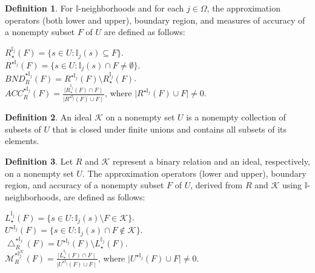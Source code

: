 \documentclass{article}
\theoremstyle{theorem}
\theoremstyle{definition}
\newtheorem{definition}{Definition}[section]
\theoremstyle{remark}
\begin{document}
\begin{definition} \label{d6} \cite{Al-shami 2021} For $\mathbb{I}$-neighborhoods and for each $j \in \Omega$, the approximation operators (both lower and upper), boundary region, and measures of accuracy of a nonempty subset $F$ of $U$ are defined as follows:

\begin{center}
$R_{\star}^{\mathbb{I}_j}(F) = \{s \in U : \mathbb{I}_{j}(s) \subseteq F\}$.\\
$R^{\star\mathbb{I}_j}(F) = \{s \in U : \mathbb{I}_{j}(s) \cap F \neq\emptyset\}$.\\
$BND_{R}^{\star\mathbb{I}_j}(F) = R^{\star\mathbb{I}_j}(F) \setminus R_{\star}^{\mathbb{I}_j}(F)$.\\
$ACC_{R}^{\star\mathbb{I}_j}(F) = \frac{\mid R_{\star}^{\mathbb{I}_j}(F)\cap F\mid}{\mid R^{\star\mathbb{I}_j}(F)\cup F\mid}$, where $\mid R^{\star\mathbb{I}_j}(F)\cup F\mid\neq0$.
\color{black}
\end{center}
\end{definition}

\begin{definition} \label{d7} \cite{Kuratowski 1966} An ideal $\mathcal{K}$ on a nonempty set $U$ is a nonempty collection of subsets of $U$ that is closed under finite unions and contains all subsets of its elements.
\end{definition}

\begin{definition} \label{d8}  \cite{R. A. Hosny 2021a} Let $R$ and $\mathcal{K}$ represent a binary relation and an ideal, respectively, on a nonempty set $U$. The approximation operators (lower and upper), boundary region, and accuracy of a nonempty subset $F$ of $U$, derived from $R$ and $\mathcal{K}$ using $\mathbb{I}$-neighborhoods, are defined as follows:

\begin{center}
$L_{\star}^{\mathbb{I}_j}(F) = \{s \in U : \mathbb{I}_{j}(s) \setminus F \in \mathcal{K}\}$.\\
$U^{\star\mathbb{I}_j}(F) = \{s \in U : \mathbb{I}_{j}(s) \cap F \not\in \mathcal{K}\}$.\\
$\bigtriangleup_{R}^{\star\mathbb{I}_j}(F) = U^{\star\mathbb{I}_j}(F) \setminus L_{\star}^{\mathbb{I}_j}(F)$.\\
$\mathcal{M}_{R}^{\star\mathbb{I}_j^\mathcal{K}}(F) = \frac{\mid L_{\star}^{\mathbb{I}_j}(F)\cap F\mid}{\mid U^{\star\mathbb{I}_j}(F)\cup F\mid}$, where $\mid U^{\star\mathbb{I}_j}(F)\cup F\mid\neq0$.\\
\color{black}
\end{center}
\end{definition}
\end{document}

